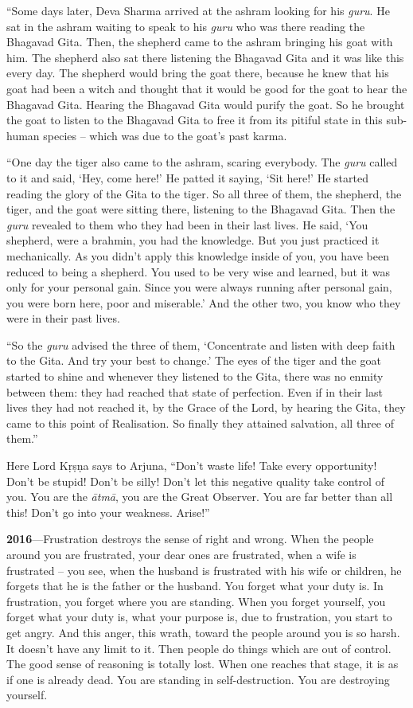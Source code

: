 “Some days later, Deva Sharma arrived at the ashram looking for his \textit{guru}. He sat in the ashram waiting to speak to his \textit{guru} who was there reading the Bhagavad Gita. Then, the shepherd came to the ashram bringing his goat with him. The shepherd also sat there listening the Bhagavad Gita and it was like this every day. The shepherd would bring the goat there, because he knew that his goat had been a witch and thought that it would be good for the goat to hear the Bhagavad Gita. Hearing the Bhagavad Gita would purify the goat. So he brought the goat to listen to the Bhagavad Gita to free it from its pitiful state in this sub-human species – which was due to the goat’s past karma.

“One day the tiger also came to the ashram, scaring everybody. The \textit{guru} called to it and said, ‘Hey, come here!’ He patted it saying, ‘Sit here!’ He started reading the glory of the Gita to the tiger. So all three of them, the shepherd, the tiger, and the goat were sitting there, listening to the Bhagavad Gita. Then the \textit{guru} revealed to them who they had been in their last lives. He said, ‘You shepherd, were a brahmin, you had the knowledge. But you just practiced it mechanically. As you didn’t apply this knowledge inside of you, you have been reduced to being a shepherd. You used to be very wise and learned, but it was only for your personal gain. Since you were always running after personal gain, you were born here, poor and miserable.’ And the other two, you know who they were in their past lives.

“So the \textit{guru} advised the three of them, ‘Concentrate and listen with deep faith to the Gita. And try your best to change.’ The eyes of the tiger and the goat started to shine and whenever they listened to the Gita, there was no enmity between them: they had reached that state of perfection. Even if in their last lives they had not reached it, by the Grace of the Lord, by hearing the Gita, they came to this point of Realisation. So finally they attained salvation, all three of them.”

Here Lord Kṛṣṇa says to Arjuna, “Don’t waste life! Take every opportunity! Don’t be stupid! Don’t be silly! Don’t let this negative quality take control of you. You are the \textit{ātmā}, you are the Great Observer. You are far better than all this! Don’t go into your weakness. Arise!”

\textbf{2016}---Frustration destroys the sense of right and wrong. When the people around you are frustrated, your dear ones are frustrated, when a wife is frustrated – you see, when the husband is frustrated with his wife or children, he forgets that he is the father or the husband. You forget what your duty is. In frustration, you forget where you are standing. When you forget yourself, you forget what your duty is, what your purpose is, due to frustration, you start to get angry. And this anger, this wrath, toward the people around you is so harsh. It doesn’t have any limit to it. Then people do things which are out of control. The good sense of reasoning is totally lost. When one reaches that stage, it is as if one is already dead. You are standing in self-destruction. You are destroying yourself.

